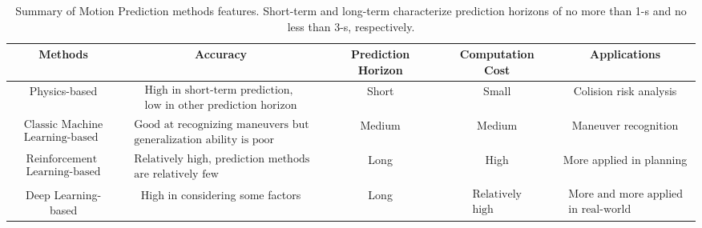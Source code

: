 \begin{table}[h]
	\centering
	\caption[Summary of Motion Prediction methods features]{Summary of Motion Prediction methods features. Short-term and long-term characterize prediction horizons of no more than 1-s and no less than 3-s, respectively.}
\begin{adjustbox}{max width=\textwidth}
\begin{tabular}{c | c c c c }
	\toprule
	Methods & Accuracy & Prediction Horizon & Computation Cost & Applications \\
	\midrule
	
	Physics-based & $\begin{array}{l}\text { High in short-term prediction,  } \\
		\text { low in other prediction horizon }\end{array}$ & Short & Small & Colision risk analysis \\
	\midrule
	 $\begin{array}{l}\text { Classic Machine } \\
		\text { Learning-based }\end{array}$ & $\begin{array}{l}\text { Good at recognizing maneuvers but } \\
		\text { generalization ability is poor }\end{array}$ & Medium & Medium & Maneuver recognition \\
	\midrule
	$\begin{array}{l}\text { Reinforcement } \\
		\text { Learning-based }\end{array}$ & $\begin{array}{l}\text { Relatively high, prediction methods  } \\
		\text { are relatively few }\end{array}$ & Long & High & More applied in planning \\
	\midrule
	Deep Learning-based & High in considering some factors & Long & $\begin{array}{l}\text { Relatively } \\
		\text { high }\end{array}$ & $\begin{array}{l}\text { More and more applied } \\
		\text { in real-world }\end{array}$ \\ 
	\bottomrule
\end{tabular}
\label{table:2_summary_mp_methods}
\end{adjustbox}
\end{table}

